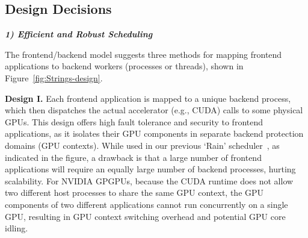 \subsection{Design Decisions}
\textbf{\textit{1) Efficient and Robust Scheduling}}

The frontend/backend model suggests three methods for mapping frontend applications to backend workers (processes or threads), shown in Figure~\ref{fig:Strings-design}.

\textbf{Design I.} 
Each frontend application is mapped to a unique backend process, which then dispatches the actual accelerator (e.g., CUDA) calls to some physical GPUs. This design offers high fault tolerance and security to frontend applications, as it isolates their GPU components in separate backend protection domains (GPU contexts). While used in our previous `Rain' scheduler~\cite{Rain}, as indicated in the figure, a drawback is that a large number of frontend applications will require an equally large number of backend processes, hurting scalability. For NVIDIA GPGPUs, because the CUDA runtime does not allow two different host processes to share the same GPU context, the GPU components of two different applications cannot run concurrently on a single GPU, resulting in GPU context switching overhead and potential GPU core idling.

